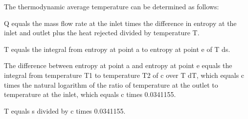 The thermodynamic average temperature can be determined as follows:

Q equals the mass flow rate at the inlet times the difference in entropy at the inlet and outlet plus the heat rejected divided by temperature T.

T equals the integral from entropy at point a to entropy at point e of T ds.

The difference between entropy at point a and entropy at point e equals the integral from temperature T1 to temperature T2 of c over T dT, which equals c times the natural logarithm of the ratio of temperature at the outlet to temperature at the inlet, which equals c times 0.0341155.

T equals s divided by c times 0.0341155.
